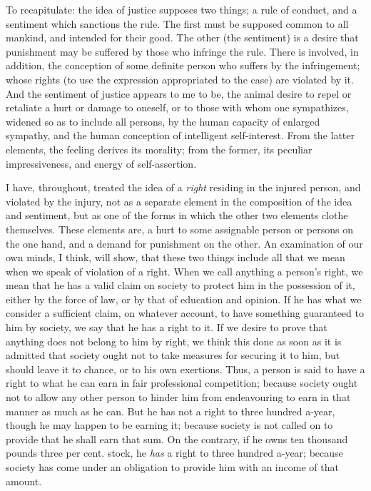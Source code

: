 \documentclass[12pt]{report}
\begin{document}
To recapitulate: the idea of justice supposes two things; a rule of conduct, and a sentiment which sanctions the rule. The first must be supposed common to all mankind, and intended for their good. The other (the sentiment) is a desire that punishment may be suffered by those who infringe the rule. There is involved, in addition, the conception of some definite person who suffers by the infringement; whose rights (to use the expression appropriated to the case) are violated by it. And the sentiment of justice appears to me to be, the animal desire to repel or retaliate a hurt or damage to oneself, or to those with whom one sympathizes, widened so as to include all persons, by the human capacity of enlarged sympathy, and the human conception of intelligent self-interest. From the latter elements, the feeling derives its morality; from the former, its peculiar impressiveness, and energy of self-assertion.

I have, throughout, treated the idea of a \emph{right} residing in the injured person, and violated by the injury, not as a separate element in the composition of the idea and sentiment, but as one of the forms in which the other two elements clothe themselves. These elements are, a hurt to some assignable person or persons on the one hand, and a demand for punishment on the other. An examination of our own minds, I think, will show, that these two things include all that we mean when we speak of violation of a right. When we call anything a person's right, we mean that he has a valid claim on society to protect him in the possession of it, either by the force of law, or by that of education and opinion. If he has what we consider a sufficient claim, on whatever account, to have something guaranteed to him by society, we say that he has a right to it. If we desire to prove that anything does not belong to him by right, we think this done as soon as it is admitted that society ought not to take measures for securing it to him, but should leave it to chance, or to his own exertions. Thus, a person is said to have a right to what he can earn in fair professional competition; because society ought not to allow any other person to hinder him from endeavouring to earn in that manner as much as he can. But he has not a right to three hundred a-year, though he may happen to be earning it; because society is not called on to provide that he shall earn that sum. On the contrary, if he owns ten thousand pounds three per cent. stock, he \emph{has} a right to three hundred a-year; because society has come under an obligation to provide him with an income of that amount.
\end{document}
